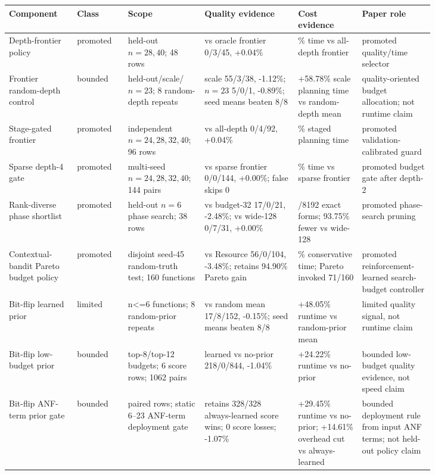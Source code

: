 \begin{tabularx}{\linewidth}{>{\raggedright\arraybackslash}p{0.16\linewidth}>{\raggedright\arraybackslash}p{0.12\linewidth}>{\raggedright\arraybackslash}p{0.18\linewidth}>{\raggedright\arraybackslash}p{0.22\linewidth}>{\raggedright\arraybackslash}p{0.15\linewidth}>{\raggedright\arraybackslash}X}
\toprule
Component & Class & Scope & Quality evidence & Cost evidence & Paper role \\
\midrule
Depth-frontier policy & promoted & held-out $n=28,40$; 48 rows & vs oracle frontier 0/3/45, +0.04\% & -51.30\% time vs all-depth frontier & promoted quality/time selector \\
Frontier random-depth control & bounded & held-out/scale/$n=23$; 8 random-depth repeats & scale 55/3/38, -1.12\%; $n=23$ 5/0/1, -0.89\%; seed means beaten 8/8 & +58.78\% scale planning time vs random-depth mean & quality-oriented budget allocation; not runtime claim \\
Stage-gated frontier & promoted & independent $n=24,28,32,40$; 96 rows & vs all-depth 0/4/92, +0.04\% & -25.43\% staged planning time & promoted validation-calibrated guard \\
Sparse depth-4 gate & promoted & multi-seed $n=24,28,32,40$; 144 pairs & vs sparse frontier 0/0/144, +0.00\%; false skips 0 & -13.43\% time vs sparse frontier & promoted budget gate after depth-2 \\
Rank-diverse phase shortlist & promoted & held-out $n=6$ phase search; 38 rows & vs budget-32 17/0/21, -2.48\%; vs wide-128 0/7/31, +0.00\% & 512/8192 exact forms; 93.75\% fewer vs wide-128 & promoted phase-search pruning \\
Contextual-bandit Pareto budget policy & promoted & disjoint seed-45 random-truth test; 160 functions & vs Resource 56/0/104, -3.48\%; retains 94.90\% Pareto gain & -13.13\% conservative time; Pareto invoked 71/160 & promoted reinforcement-learned search-budget controller \\
Bit-flip learned prior & limited & 177 n<=6 functions; 8 random-prior repeats & vs random mean 17/8/152, -0.15\%; seed means beaten 8/8 & +48.05\% runtime vs random-prior mean & limited quality signal, not runtime claim \\
Bit-flip low-budget prior & bounded & top-8/top-12 budgets; 6 score rows; 1062 pairs & learned vs no-prior 218/0/844, -1.04\% & +24.22\% runtime vs no-prior & bounded low-budget quality evidence, not speed claim \\
Bit-flip ANF-term prior gate & bounded & 1593 paired rows; static 6--23 ANF-term deployment gate & retains 328/328 always-learned score wins; 0 score losses; -1.07\% & +29.45\% runtime vs no-prior; +14.61\% overhead cut vs always-learned & bounded deployment rule from input ANF terms; not held-out policy claim \\

\end{tabularx}
